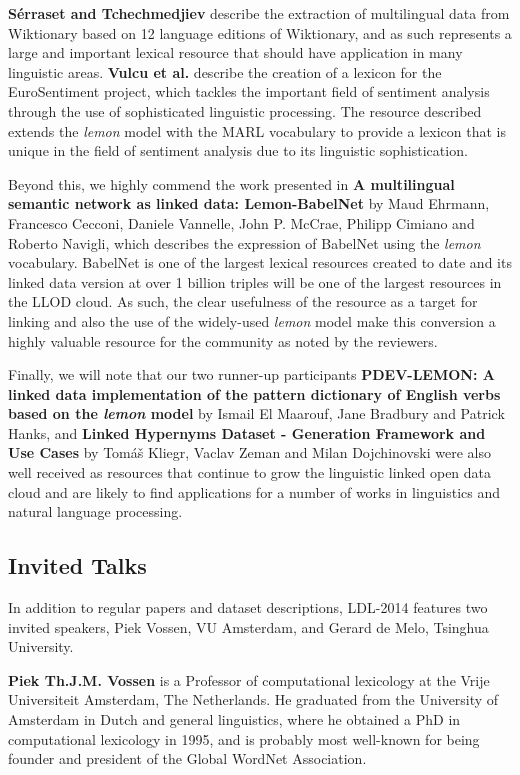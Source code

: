 \textbf{Sérraset and Tchechmedjiev} describe the extraction of multilingual data from Wiktionary 
based on 12 language editions of Wiktionary, and as such represents a large and 
important lexical resource that should have application in many linguistic areas. 
\textbf{Vulcu et al.} describe the creation of a lexicon for the EuroSentiment project, which 
tackles the important field of sentiment analysis through the use of sophisticated 
linguistic processing. The resource described extends the \textit{lemon} model 
with the MARL vocabulary to provide a lexicon that is unique in the field of sentiment 
analysis due to its linguistic sophistication. 

Beyond this, we highly commend the work presented in \textbf{A multilingual semantic network as linked data: Lemon-BabelNet} by
Maud Ehrmann, Francesco Cecconi, Daniele Vannelle, John P. McCrae, Philipp Cimiano 
and Roberto Navigli, which describes the expression of BabelNet using the \textit{lemon} 
vocabulary. BabelNet is one of the largest lexical resources created to date and 
its linked data version at over 1 billion triples will be one of the largest resources 
in the LLOD cloud. As such, the clear usefulness of the resource as a target for 
linking and also the use of the widely-used \textit{lemon} model make this conversion 
a highly valuable resource for the community as noted by the reviewers. 

Finally, 
we will note that our two runner-up participants \textbf{PDEV-LEMON: A linked data implementation 
of the pattern dictionary of English verbs based on the \textit{lemon} model} 
by  Ismail El Maarouf, Jane Bradbury and Patrick Hanks, and \textbf{Linked Hypernyms Dataset - Generation Framework 
and Use Cases} by Tomáš Kliegr, Vaclav Zeman and Milan Dojchinovski were also well received as resources that 
continue to grow the linguistic linked open data cloud and are likely to find applications 
for a number of works in linguistics and natural language processing.

\subsection{Invited Talks}

In addition to regular papers and dataset descriptions, LDL-2014 features two invited speakers, Piek Vossen, VU Amsterdam, and Gerard de Melo, Tsinghua University.

\smallskip

\textbf{Piek Th.J.M. Vossen} is a Professor of computational lexicology at the Vrije Universiteit Amsterdam, The Netherlands. He graduated from the University of Amsterdam in Dutch and general linguistics, where he obtained a PhD in computational lexicology in 1995, and is probably most well-known for being founder and president of the Global WordNet Association.

